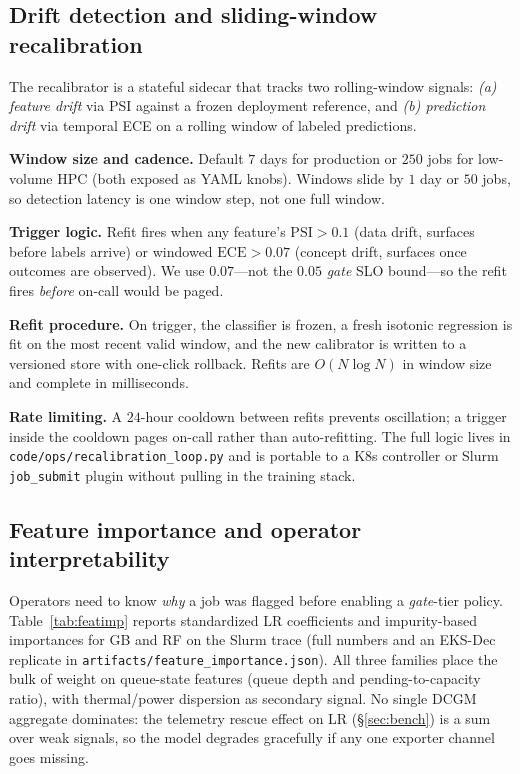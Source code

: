\documentclass[conference]{IEEEtran}
\begin{document}
\subsection{Drift detection and sliding-window recalibration}
\label{sec:recalib-method}
The recalibrator is a stateful sidecar that tracks two rolling-window signals: \emph{(a) feature drift} via PSI against a frozen deployment reference, and \emph{(b) prediction drift} via temporal ECE on a rolling window of labeled predictions.

\textbf{Window size and cadence.} Default $7$ days for production or $250$ jobs for low-volume HPC (both exposed as YAML knobs). Windows slide by $1$ day or $50$ jobs, so detection latency is one window step, not one full window.

\textbf{Trigger logic.} Refit fires when any feature's $\mathrm{PSI}{>}0.1$ (data drift, surfaces before labels arrive) or windowed $\mathrm{ECE}{>}0.07$ (concept drift, surfaces once outcomes are observed). We use $0.07$---not the $0.05$ \textit{gate} SLO bound---so the refit fires \emph{before} on-call would be paged.

\textbf{Refit procedure.} On trigger, the classifier is frozen, a fresh isotonic regression is fit on the most recent valid window, and the new calibrator is written to a versioned store with one-click rollback. Refits are $O(N \log N)$ in window size and complete in milliseconds.

\textbf{Rate limiting.} A $24$-hour cooldown between refits prevents oscillation; a trigger inside the cooldown pages on-call rather than auto-refitting. The full logic lives in \texttt{code/ops/recalibration\_loop.py} and is portable to a K8s controller or Slurm \texttt{job\_submit} plugin without pulling in the training stack.

\subsection{Feature importance and operator interpretability}
\label{sec:featimp}
Operators need to know \emph{why} a job was flagged before enabling a \textit{gate}-tier policy. Table~\ref{tab:featimp} reports standardized LR coefficients and impurity-based importances for GB and RF on the Slurm trace (full numbers and an EKS-Dec replicate in \texttt{artifacts/feature\_importance.json}). All three families place the bulk of weight on queue-state features (queue depth and pending-to-capacity ratio), with thermal/power dispersion as secondary signal. No single DCGM aggregate dominates: the telemetry rescue effect on LR (\S\ref{sec:bench}) is a sum over weak signals, so the model degrades gracefully if any one exporter channel goes missing.
\end{document}
